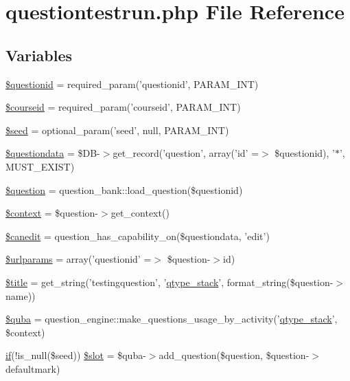 \hypertarget{questiontestrun_8php}{
\section{questiontestrun.php File Reference}
\label{questiontestrun_8php}
}
\subsection*{Variables}
\begin{DoxyCompactItemize}
\item 
\hyperlink{questiontestrun_8php_a0b8a9e6194c5b1ca51e0f19a198c19d8}{\$questionid} = required\_\-param('questionid', PARAM\_\-INT)
\item 
\hyperlink{questiontestrun_8php_a2a1b481ca3e5ae5c2d7a66d271302f23}{\$courseid} = required\_\-param('courseid', PARAM\_\-INT)
\item 
\hyperlink{questiontestrun_8php_a4aea6700edf05cf13c65dc0e758c9ad3}{\$seed} = optional\_\-param('seed', null, PARAM\_\-INT)
\item 
\hyperlink{questiontestrun_8php_ab3dbd2b3f38fc871b3aba59ed0657c55}{\$questiondata} = \$DB-\/$>$get\_\-record('question', array('id' =$>$ \$questionid), '$\ast$', MUST\_\-EXIST)
\item 
\hyperlink{questiontestrun_8php_acf0d1ba8b3999333306bf1a4fd363e93}{\$question} = question\_\-bank::load\_\-question(\$questionid)
\item 
\hyperlink{questiontestrun_8php_ae05dedb802ada0155efdece2044fed64}{\$context} = \$question-\/$>$get\_\-context()
\item 
\hyperlink{questiontestrun_8php_a69bfd8cbfcb5df8b71b7aa810fd0f55f}{\$canedit} = question\_\-has\_\-capability\_\-on(\$questiondata, 'edit')
\item 
\hyperlink{questiontestrun_8php_a1aa950c4029aca228dd33a4b27109e00}{\$urlparams} = array('questionid' =$>$ \$question-\/$>$id)
\item 
\hyperlink{questiontestrun_8php_ada57e7bb7c152edad18fe2f166188691}{\$title} = get\_\-string('testingquestion', '\hyperlink{classqtype__stack}{qtype\_\-stack}', format\_\-string(\$question-\/$>$name))
\item 
\hyperlink{questiontestrun_8php_aaed3376a71ab765cf831ccd5d4540d8e}{\$quba} = question\_\-engine::make\_\-questions\_\-usage\_\-by\_\-activity('\hyperlink{classqtype__stack}{qtype\_\-stack}', \$context)
\item 
\hyperlink{caschat_8php_a2018ad56dfaea89ba7f32f4f912be98f}{if}(!is\_\-null(\$seed)) \hyperlink{questiontestrun_8php_a9104834405465b12845577f042dae3f0}{\$slot} = \$quba-\/$>$add\_\-question(\$question, \$question-\/$>$defaultmark)

\end{DoxyCompactItemize}
